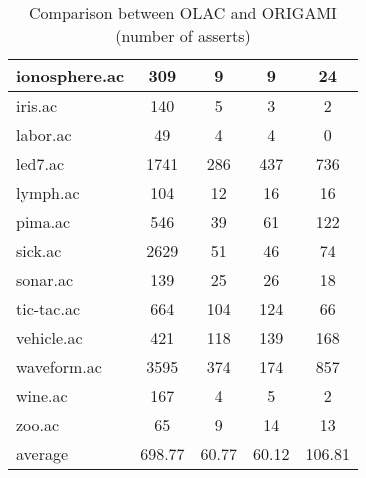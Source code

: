 \begin{table}[htbp]
\begin{tabular}{|l|c|c|c|c|}
		\hline
		ionosphere.ac   & 309           & 9                  & 9                        & 24                            \\
		\hline
		iris.ac         & 140           & 5                  & 3                        & 2                             \\
		\hline
		labor.ac        & 49            & 4                  & 4                        & 0                             \\
		\hline
		led7.ac         & 1741          & 286                & 437                      & 736                           \\
		\hline
		lymph.ac        & 104           & 12                 & 16                       & 16                            \\
		\hline
		pima.ac         & 546           & 39                 & 61                       & 122                           \\
		\hline
		sick.ac         & 2629          & 51                 & 46                       & 74                            \\
		\hline
		sonar.ac        & 139           & 25                 & 26                       & 18                            \\
		\hline
		tic-tac.ac      & 664           & 104                & 124                      & 66                            \\
		\hline
		vehicle.ac      & 421           & 118                & 139                      & 168                           \\
		\hline
		waveform.ac     & 3595          & 374                & 174                      & 857                           \\
		\hline
		wine.ac         & 167           & 4                  & 5                        & 2                             \\
		\hline
		zoo.ac          & 65            & 9                  & 14                       & 13                            \\
		\hline
		average         & 698.77        & 60.77              & 60.12                    & 106.81                        \\
		\hline
		\end{tabular}
	\caption{Comparison between OLAC and ORIGAMI (number of asserts)}
	\label{tab:comparison_olac_origami}
\end{table}